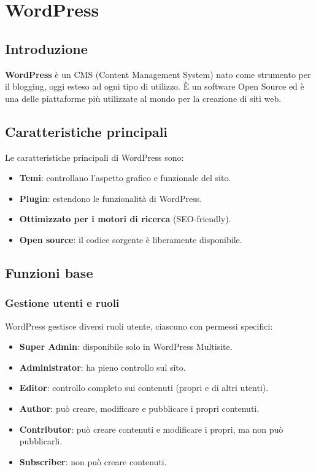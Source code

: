 \chapter{WordPress}

\section{Introduzione}

\textbf{WordPress} è un CMS (Content Management System) nato come strumento per il blogging, oggi esteso ad ogni tipo di utilizzo. È un software Open Source ed è una delle piattaforme più utilizzate al mondo per la creazione di siti web.

\section{Caratteristiche principali}

Le caratteristiche principali di WordPress sono:

\begin{itemize}
    \item \textbf{Temi}: controllano l'aspetto grafico e funzionale del sito.
    \item \textbf{Plugin}: estendono le funzionalità di WordPress.
    \item \textbf{Ottimizzato per i motori di ricerca} (SEO-friendly).
    \item \textbf{Open source}: il codice sorgente è liberamente disponibile.
\end{itemize}

\section{Funzioni base}

\subsection{Gestione utenti e ruoli}

WordPress gestisce diversi ruoli utente, ciascuno con permessi specifici:

\begin{itemize}
    \item \textbf{Super Admin}: disponibile solo in WordPress Multisite.
    \item \textbf{Administrator}: ha pieno controllo sul sito.
    \item \textbf{Editor}: controllo completo sui contenuti (propri e di altri utenti).
    \item \textbf{Author}: può creare, modificare e pubblicare i propri contenuti.
    \item \textbf{Contributor}: può creare contenuti e modificare i propri, ma non può pubblicarli.
    \item \textbf{Subscriber}: non può creare contenuti.
\end{itemize}

